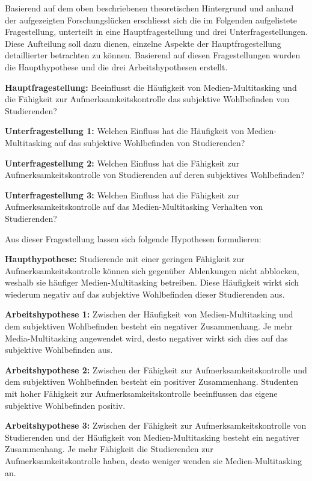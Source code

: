 \label{section.fragestellung}
Basierend auf dem oben beschriebenen theoretischen Hintergrund und anhand der aufgezeigten Forschungslücken erschliesst sich die im Folgenden aufgelistete Fragestellung, unterteilt in eine Hauptfragestellung und drei Unterfragestellungen. Diese Aufteilung soll dazu dienen, einzelne Aspekte der Hauptfragestellung detaillierter betrachten zu können. Basierend auf diesen Fragestellungen wurden die Haupthypothese und die drei Arbeitshypothesen erstellt.  
\par
\textbf{Hauptfragestellung:} Beeinflusst die Häufigkeit von Medien-Multitasking und die Fähigkeit zur Aufmerksamkeitskontrolle das subjektive Wohlbefinden von Studierenden?
\par
\textbf{Unterfragestellung 1:} Welchen Einfluss hat die Häufigkeit von Medien-Multitasking auf das subjektive Wohlbefinden von Studierenden?
\par
\textbf{Unterfragestellung 2:} Welchen Einfluss hat die Fähigkeit zur Aufmerksamkeitskontrolle von Studierenden auf deren subjektives Wohlbefinden?
\par
\textbf{Unterfragestellung 3:} Welchen Einfluss hat die Fähigkeit zur Aufmerksamkeitskontrolle auf das Medien-Multitasking Verhalten von Studierenden?
\par
Aus dieser Fragestellung lassen sich folgende Hypothesen formulieren:
\par
\textbf{Haupthypothese:}
Studierende mit einer geringen Fähigkeit zur Aufmerksamkeitskontrolle können sich gegenüber Ablenkungen nicht abblocken, weshalb sie häufiger Medien-Multitasking betreiben. Diese Häufigkeit wirkt sich wiederum negativ auf das subjektive Wohlbefinden dieser Studierenden aus.
\par
\textbf{Arbeitshypothese 1:} Zwischen der Häufigkeit von Medien-Multitasking und dem subjektiven Wohlbefinden besteht ein negativer Zusammenhang. Je mehr Media-Multitasking angewendet wird, desto negativer wirkt sich dies auf das subjektive Wohlbefinden aus.
\par
\textbf{Arbeitshypothese 2:} Zwischen der Fähigkeit zur Aufmerksamkeitskontrolle und dem subjektiven Wohlbefinden besteht ein positiver Zusammenhang. Studenten mit hoher Fähigkeit zur Aufmerksamkeitskontrolle beeinflussen das eigene subjektive Wohlbefinden positiv.
\par
\textbf{Arbeitshypothese 3:} Zwischen der Fähigkeit zur Aufmerksamkeitskontrolle von Studierenden und der Häufigkeit von Medien-Multitasking besteht ein negativer Zusammenhang. Je mehr Fähigkeit die Studierenden zur Aufmerksamkeitskontrolle haben, desto weniger wenden sie Medien-Multitasking an.
